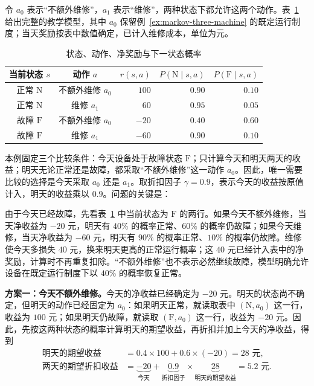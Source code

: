 \documentclass[UTF8]{ctexart}
\begin{document}
\begin{example}[维修的短期成本与后续收益]
令 $a_0$ 表示“不额外维修”，$a_1$ 表示“维修”，两种状态下都允许这两个动作。表~\ref{tab:markov-three-maintenance} 给出完整的教学模型，其中 $a_0$ 保留例~\ref{ex:markov-three-machine} 的既定运行制度；当天奖励按表中数值确定，已计入维修成本，单位为元。
\begin{table}[h]
  \centering
  \caption{状态、动作、净奖励与下一状态概率}
  \label{tab:markov-three-maintenance}
  \begin{tabular}{ccrrr}
    \toprule
    当前状态 $s$ & 动作 $a$ & $r(s,a)$ & $P(\mathrm N\mid s,a)$ & $P(\mathrm F\mid s,a)$ \\
    \midrule
    正常 $\mathrm N$ & 不额外维修 $a_0$ & $100$ & $0.90$ & $0.10$ \\
    正常 $\mathrm N$ & 维修 $a_1$ & $60$ & $0.95$ & $0.05$ \\
    故障 $\mathrm F$ & 不额外维修 $a_0$ & $-20$ & $0.40$ & $0.60$ \\
    故障 $\mathrm F$ & 维修 $a_1$ & $-60$ & $0.90$ & $0.10$ \\
    \bottomrule
  \end{tabular}
\end{table}

本例固定三个比较条件：今天设备处于故障状态 $\mathrm F$；只计算今天和明天两天的收益；明天无论正常还是故障，都采取“不额外维修”这一动作 $a_0$。因此，唯一需要比较的选择是今天采取 $a_0$ 还是 $a_1$。取折扣因子 $\gamma=0.9$，表示今天的收益按原值计入，明天的收益乘以 $0.9$。问题的关键是：

由于今天已经故障，先看表~\ref{tab:markov-three-maintenance} 中当前状态为 $\mathrm F$ 的两行。如果今天不额外维修，当天净收益为 $-20$ 元，明天有 $40\%$ 的概率正常、$60\%$ 的概率仍故障；如果今天维修，当天净收益为 $-60$ 元，明天有 $90\%$ 的概率正常、$10\%$ 的概率仍故障。维修使今天多损失 $40$ 元，换来明天更高的正常运行概率；这 $40$ 元已经计入表中的净奖励，计算时不再重复扣除。“不额外维修”也不表示必然继续故障，模型明确允许设备在既定运行制度下以 $40\%$ 的概率恢复正常。

\textbf{方案一：今天不额外维修。}今天的净收益已经确定为 $-20$ 元。明天的状态尚不确定，但明天的动作已经固定为 $a_0$：如果明天正常，就读取表中 $(\mathrm N,a_0)$ 这一行，收益为 $100$ 元；如果明天仍故障，就读取 $(\mathrm F,a_0)$ 这一行，收益为 $-20$ 元。因此，先按这两种状态的概率计算明天的期望收益，再折扣并加上今天的净收益，得到
\begin{equation}
  \begin{aligned}
    \text{明天的期望收益}
      &=0.4\times100+0.6\times(-20)=28\text{ 元},\\
    \text{两天的期望折扣收益}
      &=\underbrace{-20}_{\text{今天}}
        +\underbrace{0.9}_{\text{折扣因子}}\times
         \underbrace{28}_{\text{明天的期望收益}}
        =5.2\text{ 元}.
  \end{aligned}
  \label{eq:markov-three-maintenance-no-repair}
\end{equation}


\end{example}
\end{document}
